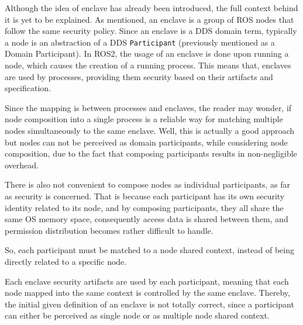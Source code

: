 Although the idea of enclave has already been introduced, the full context behind it is yet to be explained. As mentioned, an enclave is a group of ROS nodes that follow the same security policy. Since an enclave is a DDS domain term, typically a node is an abstraction of a DDS \texttt{Participant} (previously mentioned as a Domain Participant). In ROS2, the usage of an enclave is done upon running a node, which causes the creation of a running process. This means that, enclaves are used by processes, providing them security based on their artifacts and specification. 

Since the mapping is between processes and enclaves, the reader may wonder, if node composition into a single process is a reliable way for matching multiple nodes simultaneously to the same enclave. Well, this is actually a good approach but nodes can not be perceived as domain participants, while considering node composition, due to the fact that composing participants results in non-negligible overhead. 

There is also not convenient to compose nodes as individual participants, as far as security is concerned. That is because each participant has its own security identity related to its node, and by composing participants, they all share the same OS memory space, consequently access data is shared between them, and permission distribution becomes rather difficult to handle. 

So, each participant must be matched to a node shared context, instead of being directly related to a specific node. 
            

Each enclave security artifacts are used by each participant, meaning that each node mapped into the same context is controlled by the same enclave. 
Thereby, the initial given definition of an enclave is not totally correct, since a participant can either be perceived as single node or as multiple node shared context. 

